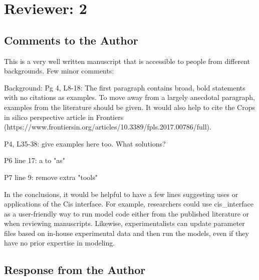 \documentclass[11pt]{article}
\newcommand{\cmark}{\ding{51}}%
\newcommand{\done}{\rlap{$\square$}{\raisebox{2pt}{\large\hspace{1pt}\cmark}}%
\hspace{-2.5pt}}
\begin{document}
\section{Reviewer: 2}

\subsection{Comments to the Author}
This is a very well written manuscript that is accessible to people from different backgrounds. Few minor comments:
\begin{todolist}
\item[\done] Background: Pg 4, L8-18: The first paragraph contains broad, bold statements with no citations as examples. To move away from a largely anecdotal paragraph, examples from the literature should be given. It would also help to cite the Crops in silico perspective article in Frontiers (https://www.frontiersin.org/articles/10.3389/fpls.2017.00786/full).
\item[\done] P4, L35-38: give examples here too. What solutions?
\item[\done] P6 line 17: a to "as"
\item[\done] P7 line 9: remove extra "tools"
\item[\done] In the conclusions, it would be helpful to have a few lines suggesting uses or applications of the Cis interface. For example, researchers could use cis{\_}interface as a user-friendly way to run model code either from the published literature or when reviewing manuscripts. Likewise, experimentalists can update parameter files based on in-house experimental data and then run the models, even if they have no prior expertise in modeling.
\end{todolist}

\subsection{Response from the Author}
\end{document}
